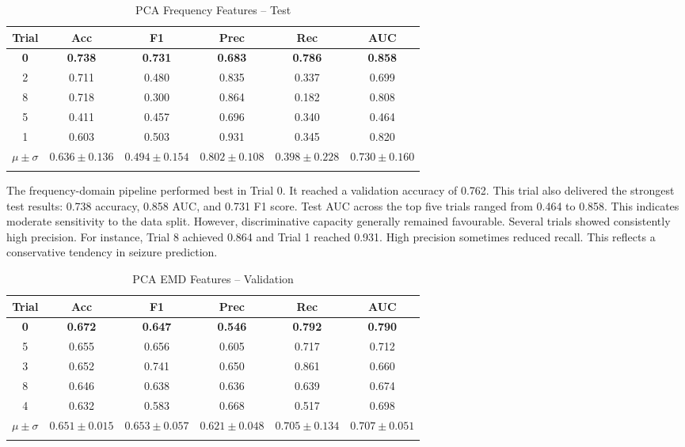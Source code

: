 \documentclass[pdflatex,sn-mathphys-num]{sn-jnl}%
\theoremstyle{thmstyleone}%
\theoremstyle{thmstyletwo}%
\theoremstyle{thmstylethree}%
\begin{document}
\begin{table}[h!]
\caption{PCA Frequency Features -- Test}\label{tab:freq_test}
{\footnotesize
\begin{tabular*}{\textwidth}{@{\extracolsep\fill}cccccc}
\toprule
Trial & Acc & F1 & Prec & Rec & AUC \\
\midrule
\textbf{0} & \textbf{0.738} & \textbf{0.731} & \textbf{0.683} & \textbf{0.786} & \textbf{0.858} \\
2 & 0.711 & 0.480 & 0.835 & 0.337 & 0.699 \\
8 & 0.718 & 0.300 & 0.864 & 0.182 & 0.808 \\
5 & 0.411 & 0.457 & 0.696 & 0.340 & 0.464 \\
1 & 0.603 & 0.503 & 0.931 & 0.345 & 0.820 \\
\midrule
$\mu{\pm}\sigma$ & $0.636{\pm}0.136$ & $0.494{\pm}0.154$ & $0.802{\pm}0.108$ & $0.398{\pm}0.228$ & $0.730{\pm}0.160$ \\
\botrule
\end{tabular*}
}
\end{table}

The frequency-domain pipeline performed best in Trial 0. It reached a validation accuracy of 0.762. This trial also delivered the strongest test results: 0.738 accuracy, 0.858 AUC, and 0.731 F1 score. Test AUC across the top five trials ranged from 0.464 to 0.858. This indicates moderate sensitivity to the data split. However, discriminative capacity generally remained favourable. Several trials showed consistently high precision. For instance, Trial 8 achieved 0.864 and Trial 1 reached 0.931. High precision sometimes reduced recall. This reflects a conservative tendency in seizure prediction.

\begin{table}[h!]
\caption{PCA EMD Features -- Validation}\label{tab:emd_val}
{\footnotesize
\begin{tabular*}{\textwidth}{@{\extracolsep\fill}cccccc}
\toprule
Trial & Acc & F1 & Prec & Rec & AUC \\
\midrule
\textbf{0} & \textbf{0.672} & \textbf{0.647} & \textbf{0.546} & \textbf{0.792} & \textbf{0.790} \\
5 & 0.655 & 0.656 & 0.605 & 0.717 & 0.712 \\
3 & 0.652 & 0.741 & 0.650 & 0.861 & 0.660 \\
8 & 0.646 & 0.638 & 0.636 & 0.639 & 0.674 \\
4 & 0.632 & 0.583 & 0.668 & 0.517 & 0.698 \\
\midrule
$\mu{\pm}\sigma$ & $0.651{\pm}0.015$ & $0.653{\pm}0.057$ & $0.621{\pm}0.048$ & $0.705{\pm}0.134$ & $0.707{\pm}0.051$ \\
\botrule
\end{tabular*}
}
\end{table}
\end{document}
